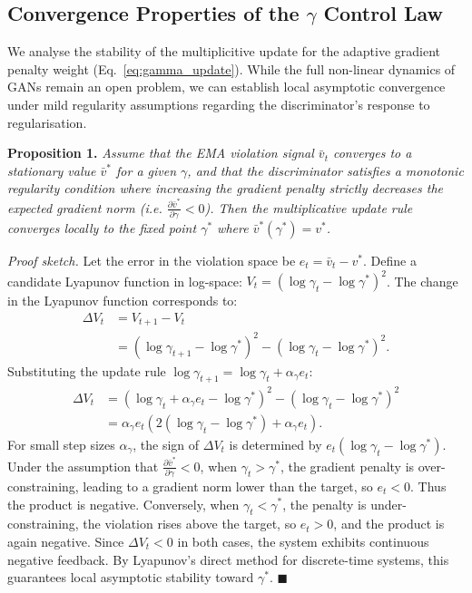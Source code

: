 \documentclass{article}
\newcommand{\vtarget}{v^{*}}
\begin{document}
\subsection{Convergence Properties of the $\gamma$ Control Law}
\label{sec:convergence}

We analyse the stability of the multiplicitive update for the adaptive gradient penalty weight (Eq.~\ref{eq:gamma_update}). While the full non-linear dynamics of GANs remain an open problem, we can establish local asymptotic convergence under mild regularity assumptions regarding the discriminator's response to regularisation.

\textbf{Proposition 1.} \emph{Assume that the EMA violation signal $\bar{v}_t$ converges to a stationary value $\bar{v}^*$ for a given $\gamma$, and that the discriminator satisfies a monotonic regularity condition where increasing the gradient penalty strictly decreases the expected gradient norm (i.e. $\frac{\partial \bar{v}^*}{\partial \gamma} < 0$). Then the multiplicative update rule converges locally to the fixed point $\gamma^*$ where $\bar{v}^*(\gamma^*) = \vtarget$.}

\emph{Proof sketch.} Let the error in the violation space be $e_t = \bar{v}_t - \vtarget$. 
Define a candidate Lyapunov function in log-space: $V_t = (\log \gamma_t - \log \gamma^*)^2$. The change in the Lyapunov function corresponds to:
\begin{align*}
\Delta V_t &= V_{t+1} - V_t \\
&= (\log \gamma_{t+1} - \log \gamma^*)^2 - (\log \gamma_t - \log \gamma^*)^2.
\end{align*}
Substituting the update rule $\log \gamma_{t+1} = \log \gamma_t + \alpha_\gamma e_t$:
\begin{align*}
\Delta V_t &= (\log \gamma_t + \alpha_\gamma e_t - \log \gamma^*)^2 - (\log \gamma_t - \log \gamma^*)^2 \\
&= \alpha_\gamma e_t \left( 2(\log \gamma_t - \log \gamma^*) + \alpha_\gamma e_t \right).
\end{align*}
For small step sizes $\alpha_\gamma$, the sign of $\Delta V_t$ is determined by $e_t (\log \gamma_t - \log \gamma^*)$.
Under the assumption that $\frac{\partial \bar{v}^*}{\partial \gamma} < 0$, when $\gamma_t > \gamma^*$, the gradient penalty is over-constraining, leading to a gradient norm lower than the target, so $e_t < 0$. Thus the product is negative. Conversely, when $\gamma_t < \gamma^*$, the penalty is under-constraining, the violation rises above the target, so $e_t > 0$, and the product is again negative. Since $\Delta V_t < 0$ in both cases, the system exhibits continuous negative feedback. By Lyapunov's direct method for discrete-time systems, this guarantees local asymptotic stability toward $\gamma^*$. \hfill $\blacksquare$
\end{document}
